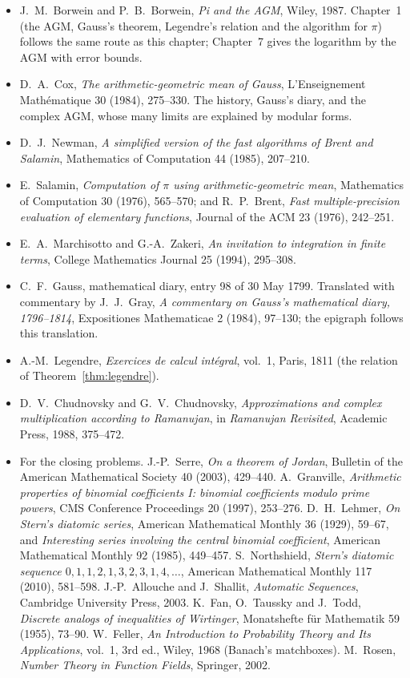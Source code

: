 \begin{itemize}
\item J.~M.~Borwein and P.~B.~Borwein, \emph{Pi and the AGM}, Wiley, 1987. Chapter~1 (the AGM, Gauss's theorem, Legendre's relation and the
algorithm for $\pi$) follows the same route as this chapter; Chapter~7 gives the logarithm by the AGM with error bounds.
\item D.~A.~Cox, \emph{The arithmetic-geometric mean of Gauss}, L'Enseignement Math\'ematique 30 (1984), 275--330. The history, Gauss's diary,
and the complex AGM, whose many limits are explained by modular forms.
\item D.~J.~Newman, \emph{A simplified version of the fast algorithms of Brent and Salamin}, Mathematics of Computation 44 (1985), 207--210.
\item E.~Salamin, \emph{Computation of $\pi$ using arithmetic-geometric mean}, Mathematics of Computation 30 (1976), 565--570; and R.~P.~Brent,
\emph{Fast multiple-precision evaluation of elementary functions}, Journal of the ACM 23 (1976), 242--251.
\item E.~A.~Marchisotto and G.-A.~Zakeri, \emph{An invitation to integration in finite terms}, College Mathematics Journal 25 (1994), 295--308.
\item C.~F.~Gauss, mathematical diary, entry 98 of 30 May 1799. Translated with commentary by J.~J.~Gray, \emph{A commentary on Gauss's
mathematical diary, 1796--1814}, Expositiones Mathematicae 2 (1984), 97--130; the epigraph follows this translation.
\item A.-M.~Legendre, \emph{Exercices de calcul int\'egral}, vol.~1, Paris, 1811 (the relation of Theorem~\ref{thm:legendre}).
\item D.~V.~Chudnovsky and G.~V.~Chudnovsky, \emph{Approximations and complex multiplication according to Ramanujan}, in \emph{Ramanujan
Revisited}, Academic Press, 1988, 375--472.
\item For the closing problems. J.-P.~Serre, \emph{On a theorem of Jordan}, Bulletin of the American Mathematical Society 40 (2003), 429--440.
A.~Granville, \emph{Arithmetic properties of binomial coefficients I: binomial coefficients modulo prime powers}, CMS Conference
Proceedings 20 (1997), 253--276. D.~H.~Lehmer, \emph{On Stern's diatomic series}, American Mathematical Monthly 36 (1929), 59--67, and
\emph{Interesting series involving the central binomial coefficient}, American Mathematical Monthly 92 (1985), 449--457. S.~Northshield,
\emph{Stern's diatomic sequence $0,1,1,2,1,3,2,3,1,4,\dots$}, American Mathematical Monthly 117 (2010), 581--598. J.-P.~Allouche and
J.~Shallit, \emph{Automatic Sequences}, Cambridge University Press, 2003. K.~Fan, O.~Taussky and J.~Todd, \emph{Discrete analogs of
inequalities of Wirtinger}, Monatshefte f\"ur Mathematik 59 (1955), 73--90. W.~Feller, \emph{An Introduction to Probability Theory and Its
Applications}, vol.~1, 3rd ed., Wiley, 1968 (Banach's matchboxes). M.~Rosen, \emph{Number Theory in Function Fields}, Springer, 2002.
\end{itemize}

